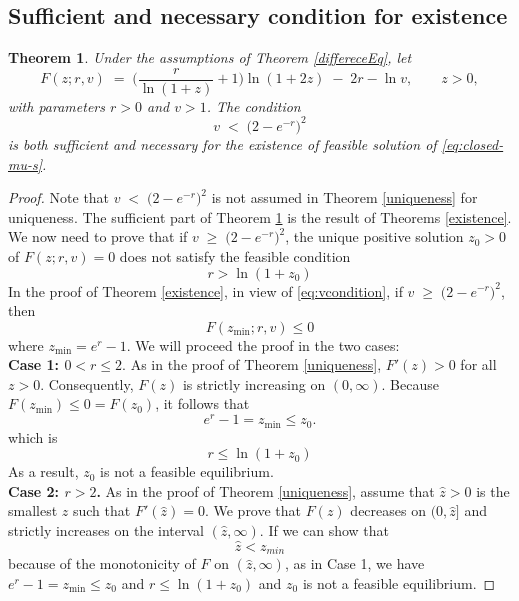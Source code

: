 \documentclass[12pt]{article}
\newtheorem{theorem}{Theorem}[section]
\theoremstyle{definition}
\begin{document}
\subsection{Sufficient and necessary condition for existence}

\begin{theorem}\label{rem1} Under the assumptions of Theorem \ref{differeceEq}, let
\[
F(z;r,v)\;=\;\Big(\frac{r}{\ln(1+z)}+1\Big)\ln(1+2z)\;-\;2r-\ln v,\qquad z>0,
\]
with parameters $r>0$ and $v>1$.  The condition $$v \;<\; \big(2-e^{-r}\big)^2$$ is both sufficient and necessary for the existence of feasible solution of \eqref{eq:closed-mu-s}.
\end{theorem}

\begin{proof}
Note that $v \;<\; \big(2-e^{-r}\big)^2$ is not assumed in Theorem \ref{uniqueness} for uniqueness. The sufficient part of Theorem \ref{rem1} is the result of Theorems \ref{existence}. We now need to prove that if $v \; \geq \; \big(2-e^{-r}\big)^2$, the unique positive solution $z_0>0$ of $F(z;r,v)=0$ does not satisfy the feasible condition 
$$
r>\ln(1+z_0)
$$   
In the proof of Theorem \ref{existence}, in view of \eqref{eq:vcondition},  
if $v \; \geq \; \big(2-e^{-r}\big)^2$, then 
$$ 
F(z_{\min};r,v) \leq 0
$$
where  $z_{\min}=e^r-1$. We will proceed the proof in the two cases: \\

\textbf{Case 1: $0 < r \le 2$}. As in the proof of Theorem \ref{uniqueness}, $F'(z) > 0$ for all $z > 0$. Consequently, $F(z)$ is strictly increasing on $(0, \infty)$. Because $F(z_{\min}) \leq  0=F(z_0)$, it follows that 
$$
e^r-1=z_{\min} \leq  z_0. 
$$
which is 
$$
r \leq \ln(1+z_0)
$$
As a result, $z_0$ is not a feasible equilibrium. \\
\textbf{Case 2: $r > 2$.} As in the proof of Theorem \ref{uniqueness}, assume that $\hat{z}>0$ is the smallest $z$ such that $F'(\hat{z})=0.$ We prove that $F(z)$ decreases on $(0, \hat{z}]$ and strictly increases on the interval $(\hat{z}, \infty)$. If we can show that
$$
\hat{z} < z_{min}
$$
because of the monotonicity of $F$ on $(\hat{z}, \infty)$,  as in Case 1, we have $e^r-1=z_{\min} \leq z_0$ and $r \leq \ln(1+z_0)$ and $z_0$ is not a feasible equilibrium.


\end{proof}
\end{document}

